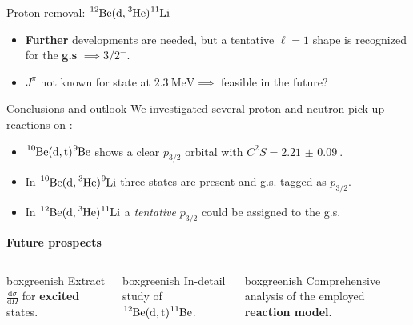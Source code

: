 \documentclass[sans,
frameno, %
mp,
usenames,dvipsnames, %
onlytextwidth, %
t,%
11pt]{beamer}
\newcommand{\iso}[2]{\ce{^{#1}#2}}
\begin{document}
\begin{frame}{Proton removal: $\iso{12}{Be}(\textrm{d}, \iso{3}{He})\iso{11}{Li}$}
{        \begin{itemize}
            \item \textbf{Further} developments are needed, but a tentative $\ell = 1$ shape is recognized for the \textbf{g.s} $\implies 3/2^{-}$.
            \item $J^{\pi}$ not known for state at $\qty{2.3}{\MeV} \implies$ feasible in the future?
        \end{itemize}
    }
\end{frame}

\begin{frame}{Conclusions and outlook }
    We investigated several proton and neutron pick-up reactions on \iso{10,12}{Be}:
    \begin{itemize}
        \item $\iso{10}{Be}(\textrm{d}, \textrm{t})\iso{9}{Be}$ shows a clear $p_{3/2}$ orbital with $C^2S = \qty{2.21(9)}{}$.
        \item In $\iso{10}{Be}(\textrm{d}, \iso{3}{He})\iso{9}{Li}$ three states are present and g.s. tagged as $p_{3/2}$.
        \item In $\iso{12}{Be}(\textrm{d}, \iso{3}{He})\iso{11}{Li}$ a \textit{tentative} $p_{3/2}$ could be assigned to the g.s.
    \end{itemize}

    \bigskip
    \begin{center}
        \textbf{Future prospects}
    \end{center}

    \bigskip
    \begin{columns}[c]
        {
            \begin{beamercolorbox}[sep=1.25ex,center, rounded=true, wd=\linewidth]{boxgreenish}
                Extract $\frac{\textrm{d}\sigma}{\textrm{d}\Omega}$ for \textbf{excited} states.
            \end{beamercolorbox}
        }
        \hfill
        {
            \begin{beamercolorbox}[sep=1.25ex,center, rounded=true, wd=\linewidth]{boxgreenish}
                In-detail study of $\iso{12}{Be}(\textrm{d}, \textrm{t})\iso{11}{Be}$.
            \end{beamercolorbox}
        }
        \hfill
        {
            \begin{beamercolorbox}[sep=1.25ex,center, rounded=true, wd=\linewidth]{boxgreenish}
                Comprehensive analysis of the employed \textbf{reaction model}.
            \end{beamercolorbox}
        }
        \hfill
    \end{columns}

\end{frame}
\end{document}
